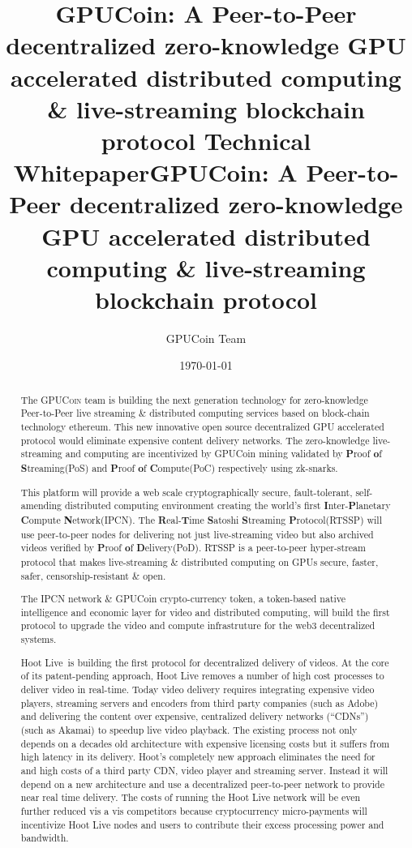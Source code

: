 \documentclass{article}
\title{
GPUCoin: A Peer-to-Peer decentralized 
zero-knowledge 
GPU accelerated 
distributed computing \&  
live-streaming 
  blockchain protocol 
 Technical Whitepaper}
\title{GPUCoin: A Peer-to-Peer decentralized zero-knowledge GPU accelerated distributed computing \& live-streaming blockchain protocol  }
\author{GPUCoin Team}
\date{\today}
\begin{document}

\maketitle

\begin{abstract}
The \textsc{GPUCoin} team is building the next generation technology for zero-knowledge Peer-to-Peer live streaming \& distributed computing services based on block-chain technology ethereum. This new innovative open source decentralized GPU accelerated 
 protocol would eliminate expensive content delivery networks. 
The zero-knowledge live-streaming and computing are incentivized by GPUCoin mining validated by \textbf{P}roof \textbf{o}f \textbf{S}treaming(PoS) and \textbf{P}roof \textbf{o}f \textbf{C}ompute(PoC) respectively using zk-snarks. 

This platform will provide a web scale cryptographically secure, fault-tolerant, self-amending distributed computing environment creating the world's first \textbf{I}nter-\textbf{P}lanetary \textbf{C}ompute \textbf{N}etwork(\textsc{IPCN}). The \textbf{R}eal-\textbf{T}ime \textbf{S}atoshi \textbf{S}treaming \textbf{P}rotocol(RTSSP) will use peer-to-peer nodes for delivering not just live-streaming video but also archived videos verified by \textbf{P}roof \textbf{o}f \textbf{D}elivery(PoD). RTSSP is a peer-to-peer hyper-stream protocol that makes live-streaming \& distributed computing on GPUs secure, faster, safer, censorship-resistant \& open. 

The IPCN network \& GPUCoin crypto-currency token, a token-based native intelligence and economic layer for video and distributed computing, will build the first protocol to upgrade the video and compute infrastruture for the web3 decentralized systems.

\iffalse
Hoot Live is building the first protocol for decentralized delivery of videos. At the core of its patent-pending approach, Hoot Live removes a number of high cost processes to deliver video in real-time. Today video delivery requires integrating expensive video players, streaming servers and encoders from third party companies (such as Adobe) and delivering the content over expensive, centralized delivery networks (“CDNs”) (such as Akamai) to speedup live video playback. The existing process not only depends on a decades old architecture with expensive licensing costs but it suffers from high latency in its delivery. Hoot’s completely new approach eliminates the need for and high costs of a third party CDN, video player and streaming server. Instead it will depend on a new architecture and use a decentralized peer-to-peer network to provide near real time delivery. The costs of running the Hoot Live network will be even further reduced vis a vis competitors because cryptocurrency micro-payments will incentivize Hoot Live nodes and users to contribute their excess processing power and bandwidth. 


\end{abstract}
\end{document}
